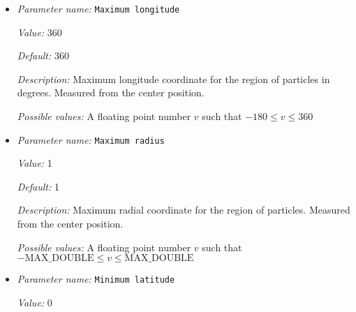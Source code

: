 \begin{itemize}
{\it Value:} 180


{\it Default:} 180


{\it Description:} Maximum latitude coordinate for the region of particles in degrees. Measured from the center position, and from the north pole.


{\it Possible values:} A floating point number $v$ such that $0 \leq v \leq 180$
\item {\it Parameter name:} {\tt Maximum longitude}
\label{parameters:Postprocess/Particles/Generator/Uniform radial/Maximum longitude}
\label{parameters:Postprocess/Particles/Generator/Uniform_20radial/Maximum_20longitude}


{\it Value:} 360


{\it Default:} 360


{\it Description:} Maximum longitude coordinate for the region of particles in degrees. Measured from the center position.


{\it Possible values:} A floating point number $v$ such that $-180 \leq v \leq 360$
\item {\it Parameter name:} {\tt Maximum radius}
\label{parameters:Postprocess/Particles/Generator/Uniform radial/Maximum radius}
\label{parameters:Postprocess/Particles/Generator/Uniform_20radial/Maximum_20radius}


{\it Value:} 1


{\it Default:} 1


{\it Description:} Maximum radial coordinate for the region of particles. Measured from the center position.


{\it Possible values:} A floating point number $v$ such that $-\text{MAX\_DOUBLE} \leq v \leq \text{MAX\_DOUBLE}$
\item {\it Parameter name:} {\tt Minimum latitude}
\label{parameters:Postprocess/Particles/Generator/Uniform radial/Minimum latitude}
\label{parameters:Postprocess/Particles/Generator/Uniform_20radial/Minimum_20latitude}


{\it Value:} 0



\end{itemize}
